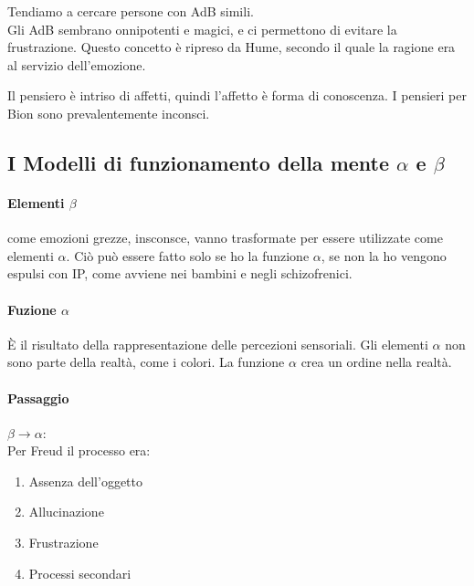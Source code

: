 \documentclass[12pt, a4paper]{article}
\begin{document}
Tendiamo a cercare persone con AdB simili. \\ Gli AdB sembrano onnipotenti e magici, e ci permettono di evitare la frustrazione. Questo concetto \`e ripreso da Hume, secondo il quale la ragione era al servizio dell'emozione. 

Il pensiero \`e intriso di affetti, quindi l'affetto \`e forma di conoscenza. I pensieri per Bion sono prevalentemente inconsci.

\subsection{I Modelli di funzionamento della mente $\alpha$ e $\beta$}

\paragraph{Elementi $\beta$} come emozioni grezze, insconsce, vanno trasformate per essere utilizzate come elementi $\alpha$. Ciò può essere fatto solo se ho la funzione $\alpha$, se non la ho vengono espulsi con IP, come avviene nei bambini e negli schizofrenici.

\paragraph{Fuzione $\alpha$} \`E il risultato della rappresentazione delle percezioni sensoriali. Gli elementi $\alpha$ non sono parte della realt\`a, come i colori. La funzione $\alpha$ crea un ordine nella realt\`a. 

\paragraph{Passaggio} $\beta \rightarrow \alpha$: \\ Per Freud il processo era: 
\begin{enumerate}
    \item Assenza dell'oggetto
    \item Allucinazione
    \item Frustrazione
    \item Processi secondari
\end{enumerate}
\end{document}

